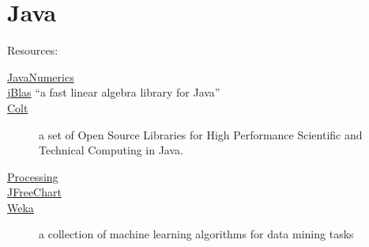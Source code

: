 \chapter{Java}

Resources:

\begin{description}
\item [\href{http://math.nist.gov/javanumerics/}{JavaNumerics}]
\item [\href{http://mikiobraun.github.io/jblas/}{jBlas} ``a fast linear algebra library for Java''
\item [\href{https://sites.google.com/site/piotrwendykier/software/parallelcolt}{Parallel Colt}]
\item [\href{http://acs.lbl.gov/software/colt/}{Colt}] a set of Open Source Libraries for High Performance Scientific and Technical Computing in Java.
\item [\href{http://www.processing.org/}{Processing}]
\item [\href{http://www.jfree.org/jfreechart/}{JFreeChart}]
\item [\href{http://www.cs.waikato.ac.nz/ml/weka/}{Weka}]  a collection of machine learning algorithms for data mining tasks
\end{description}
